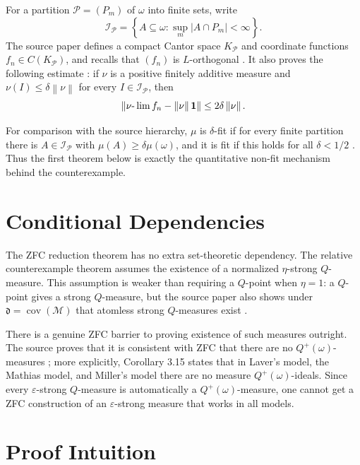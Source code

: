 \documentclass[11pt]{article}
\newcommand{\norm}[1]{\left\lVert #1\right\rVert}
\newcommand{\one}{\mathbf 1}
\begin{document}
For a partition \(\mathcal P=(P_m)\) of \(\omega\) into finite sets, write
\[
  \mathcal I_{\mathcal P}=
  \left\{A\subseteq\omega:\sup_m |A\cap P_m|<\infty\right\}.
\]
The source paper defines a compact Cantor space \(K_{\mathcal P}\) and
coordinate functions \(f_n\in C(K_{\mathcal P})\), and recalls that
\((f_n)\) is \(L\)-orthogonal \cite[Definition 4.4 and Notation 4.5]{AMPS2025}.
It also proves the following estimate \cite[Lemma 4.6]{AMPS2025}: if \(\nu\)
is a positive finitely additive measure and \(\nu(I)\le \delta\norm{\nu}\) for
every \(I\in\mathcal I_{\mathcal P}\), then
\[
  \norm{\nu\hbox{-}\lim f_n-\norm{\nu}\one}\le 2\delta\norm{\nu}.
\]

For comparison with the source hierarchy, \(\mu\) is \(\delta\)-fit if for
every finite partition there is \(A\in\mathcal I_{\mathcal P}\) with
\(\mu(A)\ge\delta\mu(\omega)\), and it is fit if this holds for all
\(\delta<1/2\) \cite[Definition 4.7]{AMPS2025}.  Thus the first theorem below
is exactly the quantitative non-fit mechanism behind the counterexample.

\section*{Conditional Dependencies}

The ZFC reduction theorem has no extra set-theoretic dependency.  The relative
counterexample theorem assumes the existence of a normalized \(\eta\)-strong
\(Q\)-measure.  This assumption is weaker than requiring a \(Q\)-point when
\(\eta=1\): a \(Q\)-point gives a strong \(Q\)-measure, but the source paper
also shows under \(\mathfrak d=\operatorname{cov}(\mathcal M)\) that atomless
strong \(Q\)-measures exist \cite[Theorem 3.1]{AMPS2025}.

There is a genuine ZFC barrier to proving existence of such measures outright.
The source proves that it is consistent with ZFC that there are no
\(Q^+(\omega)\)-measures \cite[Theorem 1.2]{AMPS2025}; more explicitly,
Corollary 3.15 states that in Laver's model, the Mathias model, and Miller's
model there are no measure \(Q^+(\omega)\)-ideals.  Since every
\(\varepsilon\)-strong \(Q\)-measure is automatically a \(Q^+(\omega)\)-measure,
one cannot get a ZFC construction of an \(\varepsilon\)-strong measure that
works in all models.

\section*{Proof Intuition}
\end{document}
